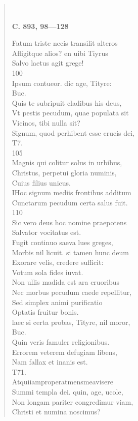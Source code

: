 \documentclass[11pt, a4paper]{report}
\begin{document}
\begin{verse}
        ﻿\pagebreak 
     \marginpar{[338]} \begin{center} \textbf{C. 893, 98—128} \end{center}Fatum triste necis transilit alteros \\ Afligitque alios? en uibi Tiyrus \\ Salvo laetus agit grege! \\ 100 \\ Ipsum contueor. dic age, Tityre: \\ Buc. \\ Quis te subripuit cladibus his deus, \\ Vt pestis pecudum, quae populata sit \\ Vicinos, tibi nulla sit? \\ Signum, quod perhibent esse crucis dei, \\ T7. \\ 105 \\ Magnis qui colitur solus in urbibus, \\ Christus, perpetui gloria numinis, \\ Cuius filius unicus. \\ IHoc signum mediis frontibus additum \\ Cunctarum pecudum certa salus fuit. \\ 110 \\ Sic vero deus hoc nomine praepotens \\ Salvator vocitatus est. \\ Fugit continuo saeva lues greges, \\ Morbis nil licuit. si tamen hunc deum \\ Exorare velis, credere sufficit: \\ Votum sola fides iuvat. \\ Non ullis madida est ara cruoribus \\ Nec morbus pecudum caede repellitur, \\ Sed simplex animi purificatio \\ Optatis fruitur bonis. \\ laec si certa probas, Tityre, nil moror, \\ Buc. \\ Quin veris famuler religionibus. \\ Errorem veterem defugiam libens, \\ Nam fallax et inanis est. \\ T71. \\ Atquiiamproperatmensmeavisere \\ Summi templa dei. quin, age, ucole, \\ Non longam pariter congredimur viam, \\ Christi et numina noscimus? \\ 

\end{verse}
\end{document}
